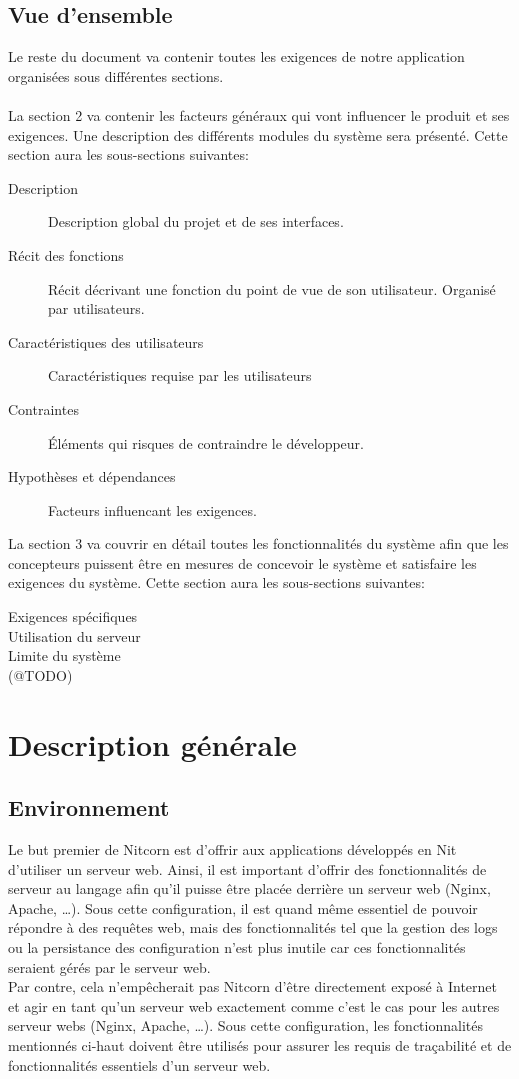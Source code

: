 \documentclass{scrreprt}
\begin{document}
\section{Vue d'ensemble}
Le  reste du document va contenir toutes les exigences de notre application organisées sous différentes sections.
\\
\\
La section 2 va contenir les facteurs généraux qui vont influencer le produit et ses exigences. Une description des différents modules du système sera présenté. Cette section aura les sous-sections suivantes:
\begin{description}
\item[Description] Description global du projet et de ses interfaces.
\item[Récit des fonctions] Récit décrivant une fonction du point de vue de son utilisateur. Organisé par utilisateurs.
\item[Caractéristiques des utilisateurs] Caractéristiques requise par les utilisateurs
\item[Contraintes] Éléments qui risques de contraindre le développeur.
\item[Hypothèses et dépendances] Facteurs influencant les exigences.
\end{description}

La section 3 va couvrir en détail toutes les fonctionnalités du système afin que les concepteurs puissent être en mesures de concevoir le système et satisfaire les exigences du système. Cette section aura les sous-sections suivantes:

\begin{description}
\item[Exigences spécifiques]
\item[Utilisation du serveur]
\item[Limite du système]
\item[(@TODO)]
\end{description}
\chapter{Description générale}
\section{Environnement}
Le but premier de Nitcorn est d'offrir aux applications développés en Nit
d'utiliser
un serveur web. Ainsi, il est important d'offrir des fonctionnalités de serveur
au langage afin qu'il puisse être placée derrière un serveur web (Nginx, Apache,
\ldots).
Sous cette configuration, il est quand même essentiel de pouvoir répondre à des
requêtes web, mais des fonctionnalités tel que la gestion des logs ou la
persistance
des configuration n'est plus inutile car ces fonctionnalités seraient gérés par
le serveur web.\\
Par contre, cela n'empêcherait pas Nitcorn d'être directement exposé à Internet
et agir en tant qu'un serveur web exactement comme c'est le cas pour les autres
serveur webs (Nginx, Apache, \ldots). Sous cette configuration, les
fonctionnalités
mentionnés ci-haut doivent être utilisés pour assurer les requis de traçabilité
et de fonctionnalités essentiels d'un serveur web.
\end{document}
